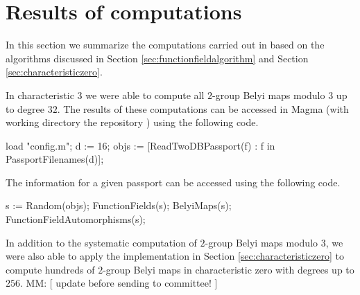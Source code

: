 \documentclass{dcthesis}
\newcommand{\mm}[1]{{\color{blue} \sf MM: [#1]}}
\numberwithin{equation}{section}
\theoremstyle{definition}
\theoremstyle{remark}
\begin{document}
{{  \section{Results of computations}{
    \label{sec:resultsequations}
    In this section we summarize
    the computations carried
    out in \cite{twogroupdessins}
    based on the algorithms
    discussed in Section
    \ref{sec:functionfieldalgorithm}
    and
    Section
    \ref{sec:characteristiczero}.
    \par
    In characteristic $3$
    we were able to compute
    all $2$-group Belyi maps modulo $3$
    up to degree $32$.
    The results of these computations can
    be accessed in \textsf{Magma}
    (with working directory the
    repository \cite{twogroupdessins})
    using
    the following code.
    \begin{magma}
load "config.m";
d := 16;
objs := [ReadTwoDBPassport(f) : f in PassportFilenames(d)];
    \end{magma}
    The information for a given passport can
    be accessed using the following code.
    \begin{magma}
s := Random(objs);
FunctionFields(s);
BelyiMaps(s);
FunctionFieldAutomorphisms(s);
    \end{magma}
    In addition to the systematic
    computation of $2$-group
    Belyi maps modulo $3$,
    we were also able to apply the
    implementation in
    Section
    \ref{sec:characteristiczero}
    to compute hundreds
    of $2$-group Belyi maps
    in characteristic zero
    with degrees up to $256$.
    \newline
    \mm{
      update before sending to committee!
    }
  }
}
}
\end{document}
